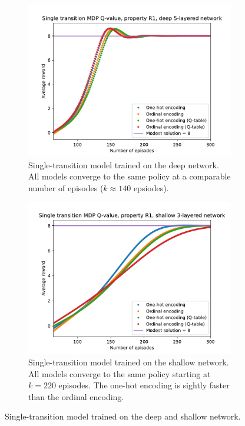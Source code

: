 \begin{figure}
    \centering
    \begin{subfigure}[b]{0.9\textwidth}
        \centering
        \includegraphics[width=\textwidth]{plot/single-transition-R1-q.pdf}
        \caption{Single-transition model trained on the deep network. All models converge to the same policy at a comparable number of episodes ($k \approx 140$ epsiodes).}
        \label{fig:single-transition-R1-deep-q}
    \end{subfigure}
    \vfill
    \begin{subfigure}[b]{0.9\textwidth}
        \centering
        \includegraphics[width=\textwidth]{plot/single-transition-R1-fc128-q.pdf}
        \caption{Single-transition model trained on the shallow network. All models converge to the same policy starting at $k = 220$ episodes. The one-hot encoding is sightly faster than the ordinal encoding.}
        \label{fig:single-transition-R1-shallow-q}
    \end{subfigure}
    \caption{Single-transition model trained on the deep and shallow network.}
    \label{fig:single-transition-R1-q}
\end{figure}

